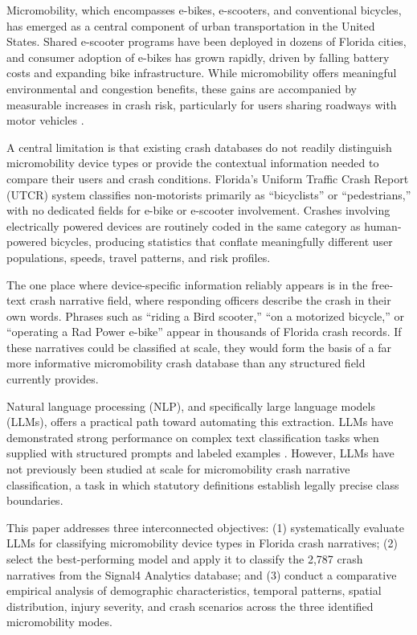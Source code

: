 \documentclass[numbered]{trbunofficial}
\begin{document}
Micromobility, which encompasses e-bikes, e-scooters, and conventional bicycles, has emerged as a central component of urban transportation in the United States. Shared e-scooter programs have been deployed in dozens of Florida cities, and consumer adoption of e-bikes has grown rapidly, driven by falling battery costs and expanding bike infrastructure. While micromobility offers meaningful environmental and congestion benefits, these gains are accompanied by measurable increases in crash risk, particularly for users sharing roadways with motor vehicles \citep{Shah2021, Mwambeleko2022}.

A central limitation is that existing crash databases do not readily distinguish micromobility device types or provide the contextual information needed to compare their users and crash conditions. Florida's Uniform Traffic Crash Report (UTCR) system classifies non-motorists primarily as ``bicyclists'' or ``pedestrians,'' with no dedicated fields for e-bike or e-scooter involvement. Crashes involving electrically powered devices are routinely coded in the same category as human-powered bicycles, producing statistics that conflate meaningfully different user populations, speeds, travel patterns, and risk profiles.

The one place where device-specific information reliably appears is in the free-text crash narrative field, where responding officers describe the crash in their own words. Phrases such as ``riding a Bird scooter,'' ``on a motorized bicycle,'' or ``operating a Rad Power e-bike'' appear in thousands of Florida crash records. If these narratives could be classified at scale, they would form the basis of a far more informative micromobility crash database than any structured field currently provides.

Natural language processing (NLP), and specifically large language models (LLMs), offers a practical path toward automating this extraction. LLMs have demonstrated strong performance on complex text classification tasks when supplied with structured prompts and labeled examples \citep{Brown2020, Wei2022}. However, LLMs have not previously been studied at scale for micromobility crash narrative classification, a task in which statutory definitions establish legally precise class boundaries.

This paper addresses three interconnected objectives: (1) systematically evaluate LLMs for classifying micromobility device types in Florida crash narratives; (2) select the best-performing model and apply it to classify the 2,787 crash narratives from the Signal4 Analytics database; and (3) conduct a comparative empirical analysis of demographic characteristics, temporal patterns, spatial distribution, injury severity, and crash scenarios across the three identified micromobility modes.
\end{document}

